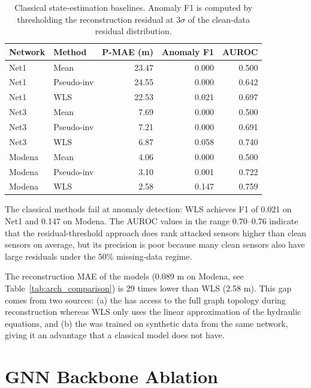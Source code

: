 \begin{table}[htbp]
  \centering
  \caption{Classical state-estimation baselines. Anomaly F1 is
  computed by thresholding the reconstruction residual at $3\sigma$
  of the clean-data residual distribution.}
  \label{tab:classical}
  \begin{tabular}{llrrr}
    \toprule
    Network & Method & P-MAE (m) & Anomaly F1 & AUROC \\
    \midrule
    Net1 & Mean        & 23.47 & 0.000 & 0.500 \\
    Net1 & Pseudo-inv  & 24.55 & 0.000 & 0.642 \\
    Net1 & WLS         & 22.53 & 0.021 & 0.697 \\
    \midrule
    Net3 & Mean        &  7.69 & 0.000 & 0.500 \\
    Net3 & Pseudo-inv  &  7.21 & 0.000 & 0.691 \\
    Net3 & WLS         &  6.87 & 0.058 & 0.740 \\
    \midrule
    Modena & Mean      &  4.06 & 0.000 & 0.500 \\
    Modena & Pseudo-inv &  3.10 & 0.001 & 0.722 \\
    Modena & WLS       &  2.58 & 0.147 & 0.759 \\
    \bottomrule
  \end{tabular}
\end{table}

The classical methods fail at anomaly detection: WLS
achieves F1 of 0.021 on Net1 and 0.147 on Modena. The AUROC
values in the range 0.70--0.76 indicate that the residual-threshold
approach does rank attacked sensors higher than clean sensors on
average, but its precision is poor because many clean sensors also
have large residuals under the 50\% missing-data regime.

The reconstruction MAE of the \gnn{} models (0.089 m on
Modena, see Table~\ref{tab:arch_comparison}) is 29 times lower than
WLS (2.58 m). This gap comes from two sources: (a) the
\gnn{} has access to the full graph topology during reconstruction
whereas WLS only uses the linear approximation of the
hydraulic equations, and (b) the \gnn{} was trained on synthetic
data from the same network, giving it an advantage that a classical
model does not have.

\section{GNN Backbone Ablation}
\label{sec:gnn_ablation}

